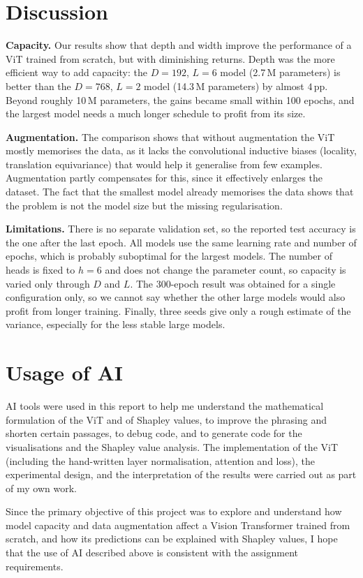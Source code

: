 \section{Discussion}

\textbf{Capacity.} Our results show that depth and width improve the performance of a ViT trained from scratch, but with diminishing returns. Depth was the more efficient way to add capacity: the $D=192$, $L=6$ model (2.7\,M parameters) is better than the $D=768$, $L=2$ model (14.3\,M parameters) by almost $4$\,pp. Beyond roughly 10\,M parameters, the gains became small within 100 epochs, and the largest model needs a much longer schedule to profit from its size.

\textbf{Augmentation.} The comparison shows that without augmentation the ViT mostly memorises the data, as it lacks the convolutional inductive biases (locality, translation equivariance) that would help it generalise from few examples. Augmentation partly compensates for this, since it effectively enlarges the dataset. The fact that the smallest model already memorises the data shows that the problem is not the model size but the missing regularisation.

\textbf{Limitations.} There is no separate validation set, so the reported test accuracy is the one after the last epoch. All models use the same learning rate and number of epochs, which is probably suboptimal for the largest models. The number of heads is fixed to $h=6$ and does not change the parameter count, so capacity is varied only through $D$ and $L$. The 300-epoch result was obtained for a single configuration only, so we cannot say whether the other large models would also profit from longer training. Finally, three seeds give only a rough estimate of the variance, especially for the less stable large models.

\section{Usage of AI}

AI tools were used in this report to help me understand the mathematical formulation of the ViT and of Shapley values, to improve the phrasing and shorten certain passages, to debug code, and to generate code for the visualisations and the Shapley value analysis. The implementation of the ViT (including the hand-written layer normalisation, attention and loss), the experimental design, and the interpretation of the results were carried out as part of my own work.

Since the primary objective of this project was to explore and understand how model capacity and data augmentation affect a Vision Transformer trained from scratch, and how its predictions can be explained with Shapley values, I hope that the use of AI described above is consistent with the assignment requirements.